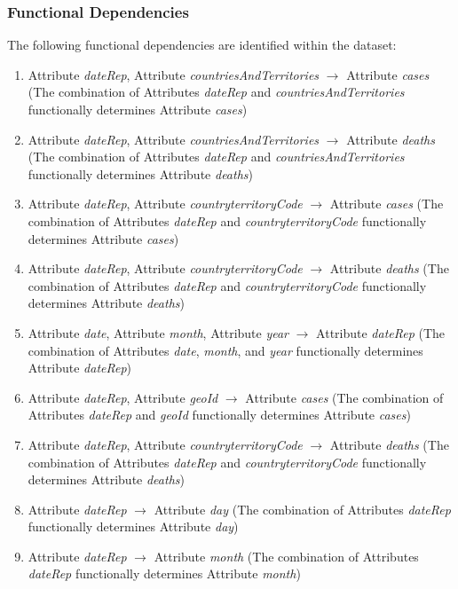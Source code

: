 \documentclass[]{article}
\begin{document}
\subsubsection{Functional Dependencies}
The following functional dependencies are identified within the dataset:
\begin{enumerate}[label=\textbf{FD\arabic*.}]
    \item Attribute \textit{dateRep}, Attribute \textit{countriesAndTerritories} $\rightarrow$ Attribute \textit{cases} (The combination of Attributes \textit{dateRep} and \textit{countriesAndTerritories} functionally determines Attribute \textit{cases})
    \item Attribute \textit{dateRep}, Attribute \textit{countriesAndTerritories} $\rightarrow$ Attribute \textit{deaths} (The combination of Attributes \textit{dateRep} and \textit{countriesAndTerritories} functionally determines Attribute \textit{deaths})
    \item Attribute \textit{dateRep}, Attribute \textit{countryterritoryCode} $\rightarrow$ Attribute \textit{cases} (The combination of Attributes \textit{dateRep} and \textit{countryterritoryCode} functionally determines Attribute \textit{cases})
    \item Attribute \textit{dateRep}, Attribute \textit{countryterritoryCode} $\rightarrow$ Attribute \textit{deaths} (The combination of Attributes \textit{dateRep} and \textit{countryterritoryCode} functionally determines Attribute \textit{deaths})
    \item Attribute \textit{date}, Attribute \textit{month}, Attribute \textit{year} $\rightarrow$ Attribute \textit{dateRep} (The combination of Attributes \textit{date}, \textit{month}, and \textit{year} functionally determines Attribute \textit{dateRep})
    \item Attribute \textit{dateRep}, Attribute \textit{geoId} $\rightarrow$ Attribute \textit{cases} (The combination of Attributes \textit{dateRep} and \textit{geoId} functionally determines Attribute \textit{cases})
    \item Attribute \textit{dateRep}, Attribute \textit{countryterritoryCode} $\rightarrow$ Attribute \textit{deaths} (The combination of Attributes \textit{dateRep} and \textit{countryterritoryCode} functionally determines Attribute \textit{deaths})
    \item Attribute \textit{dateRep} $\rightarrow$ Attribute \textit{day} (The combination of Attributes \textit{dateRep} functionally determines Attribute \textit{day})
    \item Attribute \textit{dateRep} $\rightarrow$ Attribute \textit{month} (The combination of Attributes \textit{dateRep} functionally determines Attribute \textit{month})

\end{enumerate}
\end{document}
